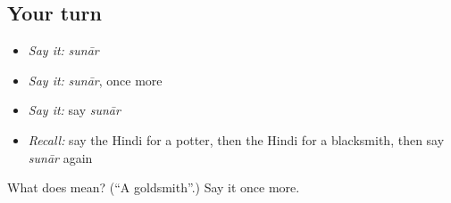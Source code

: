 \subsection*{Your turn}
\begin{itemize}
\raggedright
  \item \emph{Say it:} \emph{sunār}
  \item \emph{Say it:} \emph{sunār}, once more
  \item \emph{Say it:} say \emph{sunār}
  \item \emph{Recall:} say the Hindi for a potter, then the Hindi for a blacksmith, then say \emph{sunār} again
\end{itemize}

\begin{tcolorbox}[breakable,colback=teal!4,colframe=teal!35!black,title={Before you move on}]
What does  mean? (\textquotedblleft{}A goldsmith\textquotedblright{}.) Say it once more.
\end{tcolorbox}
